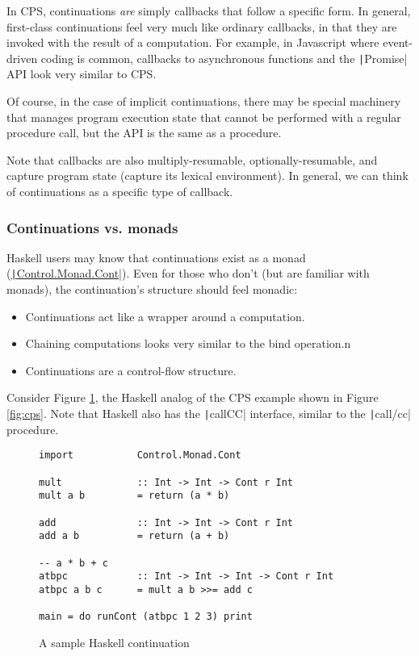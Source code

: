 \documentclass[]{article}
\begin{document}
In CPS, continuations \textit{are} simply callbacks that follow a specific form. In general, first-class continuations feel very much like ordinary callbacks, in that they are invoked with the result of a computation. For example, in Javascript where event-driven coding is common, callbacks to asynchronous functions and the \texttt|Promise| API look very similar to CPS.

Of course, in the case of implicit continuations, there may be special machinery that manages program execution state that cannot be performed with a regular procedure call, but the API is the same as a procedure.

Note that callbacks are also multiply-resumable, optionally-resumable, and capture program state (capture its lexical environment). In general, we can think of continuations as a specific type of callback.

\subsubsection{Continuations vs. monads}
\label{sec:mona}

Haskell users may know that continuations exist as a monad (\href{https://hackage.haskell.org/package/mtl-2.2.2/docs/Control-Monad-Cont.html}{\texttt|Control.Monad.Cont|}). Even for those who don't (but are familiar with monads), the continuation's structure should feel monadic:
\begin{itemize}
\item Continuations act like a wrapper around a computation.
\item Chaining computations looks very similar to the bind operation.n
\item Continuations are a control-flow structure.
\end{itemize}

Consider Figure \ref{fig:hask}, the Haskell analog of the CPS example shown in Figure \ref{fig:cps}. Note that Haskell also has the \texttt|callCC| interface, similar to the \texttt|call/cc| procedure.

\begin{figure}[h]
  \centering
\begin{verbatim}
import           Control.Monad.Cont

mult             :: Int -> Int -> Cont r Int
mult a b         = return (a * b)

add              :: Int -> Int -> Cont r Int
add a b          = return (a + b)

-- a * b + c
atbpc            :: Int -> Int -> Int -> Cont r Int
atbpc a b c      = mult a b >>= add c

main = do runCont (atbpc 1 2 3) print
\end{verbatim}
  \caption{A sample Haskell continuation}
  \label{fig:hask}
\end{figure}
\end{document}
